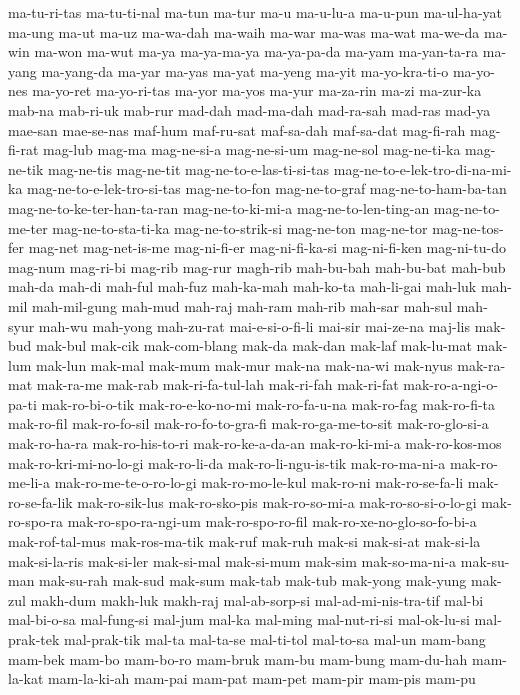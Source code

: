 {ma-tu-ri-tas ma-tu-ti-nal ma-tun ma-tur ma-u ma-u-lu-a ma-u-pun
ma-ul-ha-yat ma-ung ma-ut ma-uz ma-wa-dah ma-waih ma-war ma-was ma-wat
ma-we-da ma-win ma-won ma-wut ma-ya ma-ya-ma-ya ma-ya-pa-da ma-yam
ma-yan-ta-ra ma-yang ma-yang-da ma-yar ma-yas ma-yat ma-yeng ma-yit
ma-yo-kra-ti-o ma-yo-nes ma-yo-ret ma-yo-ri-tas ma-yor ma-yos ma-yur
ma-za-rin ma-zi ma-zur-ka mab-na mab-ri-uk mab-rur mad-dah mad-ma-dah
mad-ra-sah mad-ras mad-ya mae-san mae-se-nas maf-hum maf-ru-sat maf-sa-dah
maf-sa-dat mag-fi-rah mag-fi-rat mag-lub mag-ma mag-ne-si-a mag-ne-si-um
mag-ne-sol mag-ne-ti-ka mag-ne-tik mag-ne-tis mag-ne-tit
mag-ne-to-e-las-ti-si-tas mag-ne-to-e-lek-tro-di-na-mi-ka
mag-ne-to-e-lek-tro-si-tas mag-ne-to-fon mag-ne-to-graf
mag-ne-to-ham-ba-tan mag-ne-to-ke-ter-han-ta-ran mag-ne-to-ki-mi-a
mag-ne-to-len-ting-an mag-ne-to-me-ter mag-ne-to-sta-ti-ka
mag-ne-to-strik-si mag-ne-ton mag-ne-tor mag-ne-tos-fer mag-net
mag-net-is-me mag-ni-fi-er mag-ni-fi-ka-si mag-ni-fi-ken mag-ni-tu-do
mag-num mag-ri-bi mag-rib mag-rur magh-rib mah-bu-bah mah-bu-bat mah-bub
mah-da mah-di mah-ful mah-fuz mah-ka-mah mah-ko-ta mah-li-gai mah-luk
mah-mil mah-mil-gung mah-mud mah-raj mah-ram mah-rib mah-sar mah-sul
mah-syur mah-wu mah-yong mah-zu-rat mai-e-si-o-fi-li mai-sir mai-ze-na
maj-lis mak-bud mak-bul mak-cik mak-com-blang mak-da mak-dan mak-laf
mak-lu-mat mak-lum mak-lun mak-mal mak-mum mak-mur mak-na mak-na-wi
mak-nyus mak-ra-mat mak-ra-me mak-rab mak-ri-fa-tul-lah mak-ri-fah
mak-ri-fat mak-ro-a-ngi-o-pa-ti mak-ro-bi-o-tik mak-ro-e-ko-no-mi
mak-ro-fa-u-na mak-ro-fag mak-ro-fi-ta mak-ro-fil mak-ro-fo-sil
mak-ro-fo-to-gra-fi mak-ro-ga-me-to-sit mak-ro-glo-si-a mak-ro-ha-ra
mak-ro-his-to-ri mak-ro-ke-a-da-an mak-ro-ki-mi-a mak-ro-kos-mos
mak-ro-kri-mi-no-lo-gi mak-ro-li-da mak-ro-li-ngu-is-tik mak-ro-ma-ni-a
mak-ro-me-li-a mak-ro-me-te-o-ro-lo-gi mak-ro-mo-le-kul mak-ro-ni
mak-ro-se-fa-li mak-ro-se-fa-lik mak-ro-sik-lus mak-ro-sko-pis
mak-ro-so-mi-a mak-ro-so-si-o-lo-gi mak-ro-spo-ra mak-ro-spo-ra-ngi-um
mak-ro-spo-ro-fil mak-ro-xe-no-glo-so-fo-bi-a mak-rof-tal-mus
mak-ros-ma-tik mak-ruf mak-ruh mak-si mak-si-at mak-si-la mak-si-la-ris
mak-si-ler mak-si-mal mak-si-mum mak-sim mak-so-ma-ni-a mak-su-man
mak-su-rah mak-sud mak-sum mak-tab mak-tub mak-yong mak-yung mak-zul
makh-dum makh-luk makh-raj mal-ab-sorp-si mal-ad-mi-nis-tra-tif mal-bi
mal-bi-o-sa mal-fung-si mal-jum mal-ka mal-ming mal-nut-ri-si mal-ok-lu-si
mal-prak-tek mal-prak-tik mal-ta mal-ta-se mal-ti-tol mal-to-sa mal-un
mam-bang mam-bek mam-bo mam-bo-ro mam-bruk mam-bu mam-bung mam-du-hah
mam-la-kat mam-la-ki-ah mam-pai mam-pat mam-pet mam-pir mam-pis mam-pu
}
